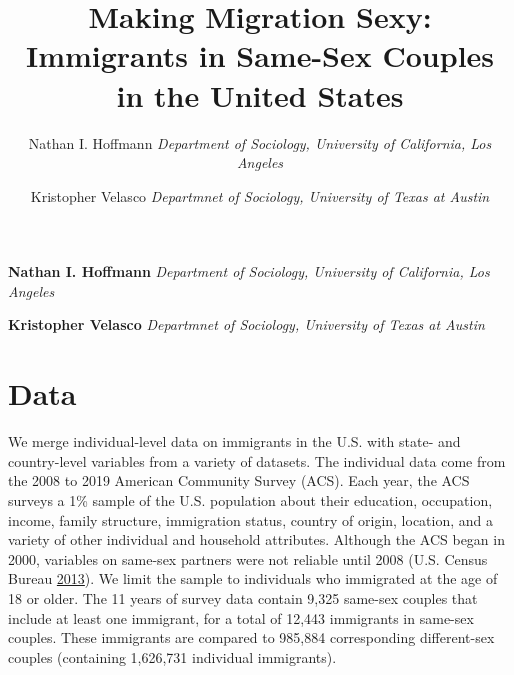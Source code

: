 \documentclass[11pt,]{article}
\title{Making Migration Sexy: Immigrants in Same-Sex Couples in the United States  }
\author{\Large Nathan I. Hoffmann\vspace{0.05in} \newline\normalsize\emph{Department of Sociology, University of California, Los Angeles}   \and \Large Kristopher Velasco\vspace{0.05in} \newline\normalsize\emph{Departmnet of Sociology, University of Texas at Austin}  }
\date{}
\newcommand*{\authorfont}{\fontfamily{phv}\selectfont}
\begin{document}
	
%

{%
\setlength{\parindent}{0pt}
\thispagestyle{plain}
{\fontsize{18}{20}\selectfont\raggedright 
\maketitle  %

}

{
   \vskip 13.5pt\relax \normalsize\fontsize{11}{12} 
\textbf{\authorfont Nathan I. Hoffmann} \hskip 15pt \emph{\small Department of Sociology, University of California, Los Angeles}   \par \textbf{\authorfont Kristopher Velasco} \hskip 15pt \emph{\small Departmnet of Sociology, University of Texas at Austin}   

}

}






\vskip -8.5pt



\noindent  

\hypertarget{data}{%
\section{Data}\label{data}}

We merge individual-level data on immigrants in the U.S. with state- and country-level variables from a variety of datasets. The individual data come from the 2008 to 2019 American Community Survey (ACS). Each year, the ACS surveys a 1\% sample of the U.S. population about their education, occupation, income, family structure, immigration status, country of origin, location, and a variety of other individual and household attributes. Although the ACS began in 2000, variables on same-sex partners were not reliable until 2008 (U.S. Census Bureau \protect\hyperlink{ref-u.s.censusbureau_2013}{2013}). We limit the sample to individuals who immigrated at the age of 18 or older. The 11 years of survey data contain 9,325 same-sex couples that include at least one immigrant, for a total of 12,443 immigrants in same-sex couples. These immigrants are compared to 985,884 corresponding different-sex couples (containing 1,626,731 individual immigrants).
\end{document}
